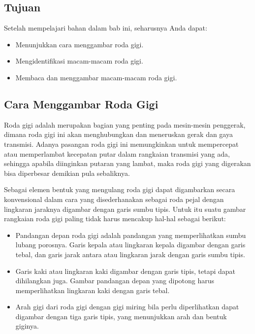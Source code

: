 \documentclass[../menggambarteknik.tex]{subfiles}
\begin{document}
\subsection{Tujuan}%
\label{sub:tujuan}

Setelah mempelajari bahan dalam bab ini, seharusnya Anda dapat:

\begin{itemize}
	\item Menunjukkan cara menggambar roda gigi.
	\item Mengidentifikasi macam-macam roda gigi.
	\item Membaca dan menggambar macam-macam roda gigi.
\end{itemize}

\subsection{Cara Menggambar Roda Gigi}%
\label{sub:cara_menggambar_roda_gigi}


Roda gigi adalah merupakan bagian yang penting pada mesin-mesin penggerak, dimana roda gigi ini akan menghubungkan dan meneruskan gerak dan gaya transmisi. Adanya pasangan roda gigi ini memungkinkan untuk mempercepat atau memperlambat kecepatan putar dalam rangkaian transmisi yang ada, sehingga apabila diinginkan putaran yang lambat, maka roda gigi yang digerakan bisa diperbesar demikian pula sebaliknya.

Sebagai elemen bentuk yang mengulang roda gigi dapat digambarkan secara konvensional dalam cara yang disederhanakan sebagai roda pejal dengan lingkaran jaraknya digambar dengan garis sumbu tipis. Untuk itu suatu gambar rangkaian roda gigi paling tidak harus mencakup hal-hal sebagai berikut:

\begin{itemize}
	\item Pandangan depan roda gigi adalah pandangan yang memperlihatkan sumbu lubang porosnya. Garis kepala atau lingkaran kepala digambar dengan garis tebal, dan garis jarak antara atau lingkaran jarak dengan garis sumbu tipis.
	\item Garis kaki atau lingkaran kaki digambar dengan garis tipis, tetapi dapat dihilangkan juga. Gambar pandangan depan yang dipotong harus memperlihatkan lingkaran kaki dengan garis tebal.
	\item Arah gigi dari roda gigi dengan gigi miring bila perlu diperlihatkan dapat digambar dengan tiga garis tipis, yang menunjukkan arah dan bentuk giginya.
\end{itemize}
\end{document}
